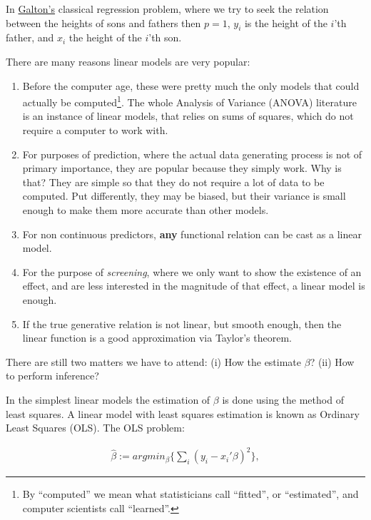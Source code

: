 \documentclass[]{book}
\theoremstyle{definition}
\theoremstyle{definition}
\theoremstyle{definition}
\theoremstyle{remark}
\let\BeginKnitrBlock\begin \let\EndKnitrBlock\end
\begin{document}
\BeginKnitrBlock{remark}
{}In
\href{https://en.wikipedia.org/wiki/Regression_toward_the_mean}{Galton's}
classical regression problem, where we try to seek the relation between
the heights of sons and fathers then \(p=1\), \(y_i\) is the height of
the \(i\)'th father, and \(x_i\) the height of the \(i\)'th son.
\EndKnitrBlock{remark}

There are many reasons linear models are very popular:

\begin{enumerate}
\def\labelenumi{\arabic{enumi}.}
\item
  Before the computer age, these were pretty much the only models that
  could actually be computed\footnote{By ``computed'' we mean what
    statisticians call ``fitted'', or ``estimated'', and computer
    scientists call ``learned''.}. The whole Analysis of Variance
  (ANOVA) literature is an instance of linear models, that relies on
  sums of squares, which do not require a computer to work with.
\item
  For purposes of prediction, where the actual data generating process
  is not of primary importance, they are popular because they simply
  work. Why is that? They are simple so that they do not require a lot
  of data to be computed. Put differently, they may be biased, but their
  variance is small enough to make them more accurate than other models.
\item
  For non continuous predictors, \textbf{any} functional relation can be
  cast as a linear model.
\item
  For the purpose of \emph{screening}, where we only want to show the
  existence of an effect, and are less interested in the magnitude of
  that effect, a linear model is enough.
\item
  If the true generative relation is not linear, but smooth enough, then
  the linear function is a good approximation via Taylor's theorem.
\end{enumerate}

There are still two matters we have to attend: (i) How the estimate
\(\beta\)? (ii) How to perform inference?

In the simplest linear models the estimation of \(\beta\) is done using
the method of least squares. A linear model with least squares
estimation is known as Ordinary Least Squares (OLS). The OLS problem:

\begin{align}
  \hat \beta:= argmin_\beta \{ \sum_i (y_i-x_i'\beta)^2 \},
  \label{eq:ols}
\end{align}
\end{document}
